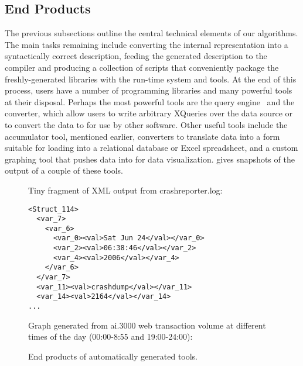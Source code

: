  

\subsection {End Products}

The previous subsections outline the central technical elements of our
algorithms.  The main tasks remaining include converting the internal
representation into a syntactically correct \pads{} description, feeding
the generated description to the \pads{} compiler and producing a 
collection of scripts that conveniently package the freshly-generated 
libraries with the \pads{} run-time system and tools.  At the end of 
this process, users have a number of programming libraries
and many powerful tools at their disposal.
Perhaps the most powerful tools are the \padx{} query 
engine~\cite{fernandez+:padx} and the \xml{} converter, which allow  
users to write arbitrary XQueries over the data source
or to convert the data to \xml{} for use by other software. Other
useful tools include the accumulator tool, mentioned earlier,
converters to translate data into a form suitable for
loading into a relational database or Excel spreadsheet, and
a custom graphing tool that pushes data into  for data
visualization.
 gives snapshots of the output of a couple
of these tools. 

\begin{figure}

Tiny fragment of XML output from crashreporter.log:

\begin{center}
{\small
\begin{verbatim}
<Struct_114>
  <var_7>
    <var_6>
      <var_0><val>Sat Jun 24</val></var_0>
      <var_2><val>06:38:46</val></var_2>
      <var_4><val>2006</val></var_4>
    </var_6>
  </var_7>
  <var_11><val>crashdump</val></var_11>
  <var_14><val>2164</val></var_14>
...

\end{verbatim}
}

\end{center}
Graph generated from ai.3000 web transaction volume at different
times of the day (00:00-8:55 and 19:00-24:00):
\begin{center}

\caption{End products of automatically generated tools.} \shrink
\label{fig:final-products}
\end{center}
\end{figure}


